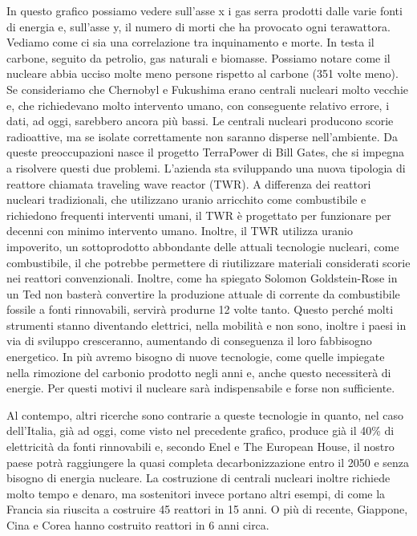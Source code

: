 \documentclass[12pt]{book} %
\begin{document}
In questo grafico possiamo vedere sull'asse x i gas serra prodotti dalle varie fonti di energia e,
sull'asse y, il numero di morti che ha provocato ogni terawattora. Vediamo come ci sia una
correlazione tra inquinamento e morte. In testa il carbone, seguito da petrolio, gas naturali e biomasse. Possiamo
notare come il nucleare abbia ucciso molte meno persone rispetto al carbone (351 volte meno). Se consideriamo che
Chernobyl e Fukushima erano centrali nucleari molto vecchie e, che richiedevano molto intervento umano, con conseguente
relativo errore, i dati, ad oggi, sarebbero ancora più bassi. Le centrali nucleari producono scorie radioattive,
ma se isolate correttamente non saranno disperse nell'ambiente. Da queste preoccupazioni nasce il progetto
TerraPower di Bill Gates, che si impegna a risolvere questi due
problemi. L'azienda sta sviluppando una nuova tipologia di reattore chiamata traveling wave reactor (TWR). A differenza dei reattori nucleari tradizionali, che utilizzano uranio arricchito come combustibile e richiedono frequenti interventi umani, il TWR è progettato per funzionare per decenni con minimo intervento umano.
Inoltre, il TWR utilizza uranio impoverito, un sottoprodotto abbondante delle attuali tecnologie nucleari, come combustibile, il che potrebbe permettere di riutilizzare materiali considerati scorie nei reattori convenzionali. Inoltre, come ha spiegato Solomon Goldstein-Rose in un
Ted non basterà convertire la produzione attuale di corrente da combustibile fossile a fonti rinnovabili, servirà
produrne 12 volte tanto. Questo perché molti strumenti stanno diventando elettrici, nella mobilità e non sono, inoltre
i paesi in via di sviluppo cresceranno, aumentando di conseguenza il loro fabbisogno energetico. In più avremo bisogno
di nuove tecnologie, come quelle impiegate nella rimozione del carbonio prodotto negli anni e, anche questo necessiterà
di energie. Per questi motivi il nucleare sarà indispensabile e forse non sufficiente.

Al contempo, altri ricerche sono contrarie a queste tecnologie in quanto, nel caso dell'Italia, già
ad oggi, come visto nel precedente grafico, produce già il 40\% di elettricità da fonti
rinnovabili
 e, secondo Enel e The
European House, il nostro paese potrà raggiungere la quasi completa decarbonizzazione entro il 2050 e senza bisogno di
energia
nucleare.
La costruzione di centrali nucleari inoltre richiede molto tempo e denaro, ma sostenitori invece portano altri esempi, di come la Francia sia riuscita a costruire 45 reattori in 15 anni. O più di recente, Giappone, Cina e Corea hanno costruito reattori in 6 anni circa.
\end{document}
